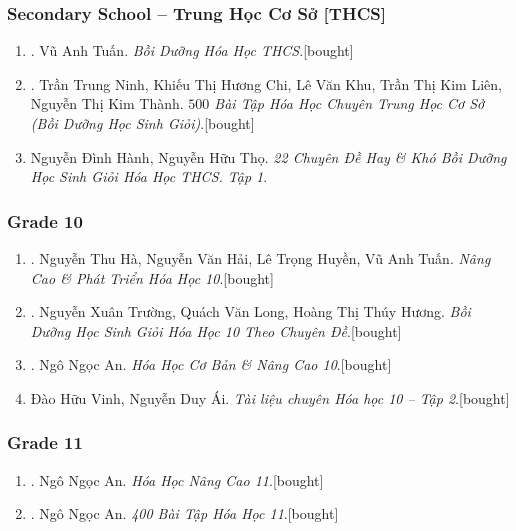 \documentclass{article}
\begin{document}
\subsubsection{Secondary School -- Trung Học Cơ Sở [THCS]}

\begin{enumerate}
	\item \cite{Tuan2022}. Vũ Anh Tuấn. \textit{Bồi Dưỡng Hóa Học THCS}.\hfill\textsf{[bought]}
	\item \cite{Ninh_Chi_Khu_Lien_Thanh2019}. Trần Trung Ninh, Khiếu Thị Hương Chi, Lê Văn Khu, Trần Thị Kim Liên, Nguyễn Thị Kim Thành. \textit{$500$ Bài Tập Hóa Học Chuyên Trung Học Cơ Sở (Bồi Dưỡng Học Sinh Giỏi)}.\hfill\textsf{[bought]}
	\item Nguyễn Đình Hành, Nguyễn Hữu Thọ. \textit{22 Chuyên Đề Hay \& Khó Bồi Dưỡng Học Sinh Giỏi Hóa Học THCS. Tập 1}.
\end{enumerate}

\subsubsection{Grade 10}

\begin{enumerate}
	\item \cite{Ha_Hai_Huyen_Tuan2022}. Nguyễn Thu Hà, Nguyễn Văn Hải, Lê Trọng Huyền, Vũ Anh Tuấn. \textit{Nâng Cao \& Phát Triển Hóa Học 10}.\hfill\textsf{[bought]}
	\item \cite{Truong_Long_Huong2022}. Nguyễn Xuân Trường, Quách Văn Long, Hoàng Thị Thúy Hương. \textit{Bồi Dưỡng Học Sinh Giỏi Hóa Học 10 Theo Chuyên Đề}.\hfill\textsf{[bought]}
	\item \cite{An_Hoa_Hoc_co_ban_nang_cao_10}. Ngô Ngọc An. \textit{Hóa Học Cơ Bản \& Nâng Cao 10}.\hfill\textsf{[bought]}
	\item Đào Hữu Vinh, Nguyễn Duy Ái. \textit{Tài liệu chuyên Hóa học 10 -- Tập 2}.\hfill\textsf{[bought]}
\end{enumerate}

\subsubsection{Grade 11}

\begin{enumerate}
	\item \cite{An_Hoa_Hoc_nang_cao_11}. Ngô Ngọc An. \textit{Hóa Học Nâng Cao 11}.\hfill\textsf{[bought]}
	\item \cite{An_400_BT_Hoa_Hoc_11}. Ngô Ngọc An. \textit{400 Bài Tập Hóa Học 11}.\hfill\textsf{[bought]}
\end{enumerate}
\end{document}
